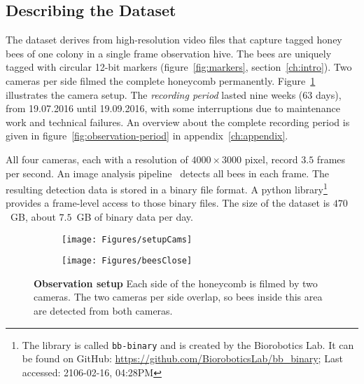 \subsection{Describing the Dataset}
\label{sec:dataset}
The dataset derives from high-resolution video files that capture tagged honey bees of one colony in a single frame observation hive.
The bees are uniquely tagged with circular 12-bit markers (figure~\ref{fig:markers}, section~\ref{ch:intro}).
Two cameras per side filmed the complete honeycomb permanently.
Figure~\ref{fig:obssetup} illustrates the camera setup.
The \emph{recording period} lasted nine weeks (63 days), from 19.07.2016 until 19.09.2016, with some interruptions due to maintenance work and technical failures. An overview about the complete recording period is given in figure~\ref{fig:observation-period} in appendix~\ref{ch:appendix}.

All four cameras, each with a resolution of $4000\times3000$ pixel, record $3.5$ frames per second. 
An image analysis pipeline~\cite{wario2015automatic} detects all bees in each frame.
The resulting detection data is stored in a binary file format.
A python library\footnote{The library is called \texttt{bb-binary} and is created by the Biorobotics Lab. It can be found on GitHub: \url{https://github.com/BioroboticsLab/bb_binary}; Last accessed: 2106-02-16, 04:28PM} provides a frame-level access to those binary files.
The size of the dataset is $470$~GB, about $7.5$~GB of binary data per day.

\begin{figure}
    \centering
    \begin{subfigure}[htb]{\textwidth}
	\centering
	\texttt{[image: Figures/setupCams]}
	\vspace{0mm}
    \end{subfigure}
    \begin{subfigure}[b]{\textwidth}
	\centering
	\texttt{[image: Figures/beesClose]}
    \end{subfigure}
    \vspace{0mm}
 	\caption[Observation setup]{\textbf{Observation setup} Each side of the honeycomb is filmed by two cameras. The two cameras per side overlap, so bees inside this area are detected from both cameras.}
 	\label{fig:obssetup}
\end{figure}

